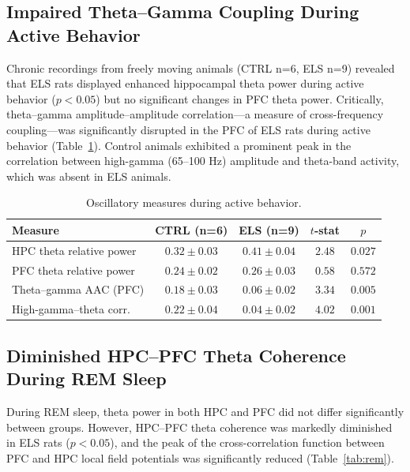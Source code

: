 \documentclass[11pt]{article}
\begin{document}
\subsection{Impaired Theta--Gamma Coupling During Active Behavior}

Chronic recordings from freely moving animals (CTRL n=6, ELS n=9) revealed that ELS rats displayed enhanced hippocampal theta power during active behavior ($p<0.05$) but no significant changes in PFC theta power. Critically, theta--gamma amplitude--amplitude correlation---a measure of cross-frequency coupling---was significantly disrupted in the PFC of ELS rats during active behavior (Table~\ref{tab:coupling}). Control animals exhibited a prominent peak in the correlation between high-gamma (65--100 Hz) amplitude and theta-band activity, which was absent in ELS animals.

\begin{table}[H]
\centering
\caption{Oscillatory measures during active behavior.}
\label{tab:coupling}
\begin{tabular}{lcccc}
\toprule
\textbf{Measure} & \textbf{CTRL (n=6)} & \textbf{ELS (n=9)} & \textbf{$t$-stat} & \textbf{$p$} \\
\midrule
HPC theta relative power & $0.32 \pm 0.03$ & $0.41 \pm 0.04$ & $2.48$ & $0.027$ \\
PFC theta relative power & $0.24 \pm 0.02$ & $0.26 \pm 0.03$ & $0.58$ & $0.572$ \\
Theta--gamma AAC (PFC) & $0.18 \pm 0.03$ & $0.06 \pm 0.02$ & $3.34$ & $0.005$ \\
High-gamma--theta corr. & $0.22 \pm 0.04$ & $0.04 \pm 0.02$ & $4.02$ & $0.001$ \\
\bottomrule
\end{tabular}
\end{table}

\subsection{Diminished HPC--PFC Theta Coherence During REM Sleep}

During REM sleep, theta power in both HPC and PFC did not differ significantly between groups. However, HPC--PFC theta coherence was markedly diminished in ELS rats ($p<0.05$), and the peak of the cross-correlation function between PFC and HPC local field potentials was significantly reduced (Table~\ref{tab:rem}).
\end{document}
